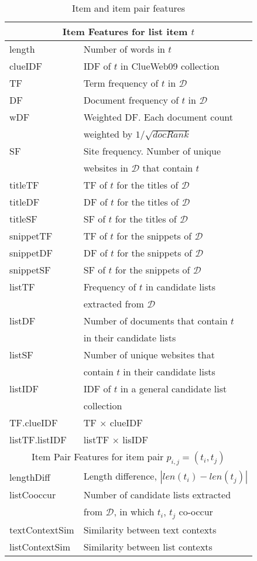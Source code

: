 \begin{table}[t!]
\vspace{-3mm}
\centering
\caption{Item and item pair features}
\label{tab:feature}
\begin{tabular}{ |l|l| }
  \hline
  \multicolumn{2}{|c|}{Item Features for list item $t$} \\
  \hline
  length  & Number of words in $t$ \\
  clueIDF & IDF of $t$ in ClueWeb09 collection\\
  TF & Term frequency of $t$ in $\mathcal{D}$\\
  DF & Document frequency of $t$ in $\mathcal{D}$\\
  wDF & Weighted DF. Each document count \\ & weighted by $1/\sqrt{docRank}$\\
  SF & Site frequency. Number of unique \\ & websites  in $\mathcal{D}$ that contain $t$\\
  titleTF & TF of $t$ for the titles of $\mathcal{D}$\\
  titleDF & DF of $t$ for the titles of $\mathcal{D}$\\
  titleSF & SF of $t$ for the titles of $\mathcal{D}$\\
  snippetTF & TF of $t$ for the snippets of $\mathcal{D}$\\
  snippetDF & DF of $t$ for the snippets of $\mathcal{D}$\\
  snippetSF & SF of $t$ for the snippets of $\mathcal{D}$\\ 
  listTF & Frequency of $t$ in candidate lists \\ & extracted from $\mathcal{D}$\\
  listDF & Number of documents that contain $t$ \\ & in their candidate lists\\
  listSF & Number of unique websites that \\ & contain $t$  in their candidate lists\\
  listIDF & IDF of $t$ in a general candidate list\\ &  collection\\
  TF.clueIDF & TF $\times$ clueIDF\\
  listTF.listIDF & listTF $\times$ lisIDF\\
  \hline
  \multicolumn{2}{|c|}{Item Pair Features for item pair $p_{i,j}=(t_i, t_j)$} \\ \hline
  lengthDiff  & Length difference, $|len(t_i) - len(t_j)|$ \\
  listCooccur & Number of candidate lists extracted \\ & from $\mathcal{D}$, in which $t_i$, $t_j$ co-occur\\
  textContextSim & Similarity between text contexts\\
  listContextSim & Similarity between list contexts\\
\hline
\end{tabular}
\end{table}

